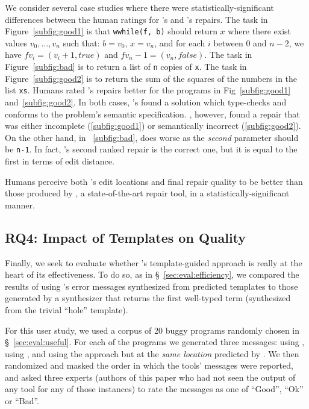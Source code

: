 %
We consider several case studies where there were
statistically-significant differences between
the human ratings for \toolname's and \seminal's
repairs.
%
The task in Figure~\ref{subfig:good1} is that
\texttt{wwhile(f, b)} should return $x$ where
there exist values $v_0,...,v_n$ such that:
$b = v_0$, $x = v_n$, and for each $i$ between
0 and $n-2$, we have $f v_i = (v_i+1, true)$
and $f v_n-1 = (v_n, false)$.
%
The task in Figure~\ref{subfig:bad} is to
return a list of \texttt{n} copies of \texttt{x}.
%
The task in Figure~\ref{subfig:good2} is to
return the sum of the squares of the numbers
in the list \texttt{xs}.
%
Humans rated \toolname's repairs better
for the programs in Fig~\ref{subfig:good1}
and~\ref{subfig:good2}.
%
In both cases, \toolname's found a solution
which type-checks and conforms to the problem's
semantic specification.
%
\seminal, however, found a repair that was
either incomplete (\ref{subfig:good1}) or
semantically incorrect (\ref{subfig:good2}).
On the other hand, in ~\ref{subfig:bad}, \toolname
does worse as the \emph{second} parameter should
be \verb|n-1|. In fact, \toolname's second ranked
repair is the correct one, but it is equal
to the first in terms of edit distance.

\begin{framed}
\noindent Humans perceive both \toolname's edit locations
 and final repair quality to be better than those produced
 by \seminal, a state-of-the-art \ocaml repair tool, in a
 statistically-significant manner.
\end{framed}

\subsection{RQ4: Impact of Templates on Quality}
\label{sec:eval:template_quality}

Finally, we seek to evaluate whether \toolname's template-guided
approach is really at the heart of its effectiveness. To do so,
as in \S~\ref{sec:eval:efficiency}, we
compared the results of using \toolname's error messages
synthesized from predicted templates to those generated by
a \naive synthesizer that returns the first well-typed term
(\ie synthesized from the trivial ``hole'' template).

%
For this user study, we used a corpus of 20 buggy programs randomly chosen in
\S~\ref{sec:eval:useful}. For each of the programs we generated three messages:
using \toolname, using \seminal, and using the \naive approach but at the
\emph{same location} predicted by \toolname. We then randomized and masked the
order in which the tools' messages were reported, and asked three experts
(authors of this paper who had not seen the output of any tool for any of those
instances) to rate the messages as one of ``Good'', ``Ok'' or ``Bad''.

